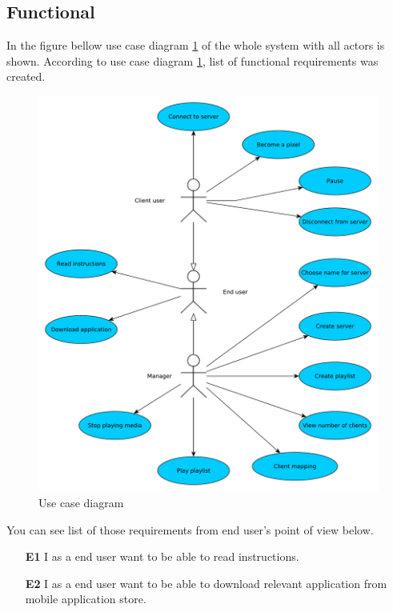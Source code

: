 \subsection{Functional}
In the figure bellow use case diagram \ref{img:usecase} of the whole system with all actors is shown.
According to use case diagram \ref{img:usecase}, list of functional requirements was created.

\begin{figure}[h!]
    \begin{center}
    \includegraphics[scale=0.45]{images/usecase.pdf}
    \caption{Use case diagram}
    \label{img:usecase}
    \end{center}
\end{figure}

You can see list of those requirements from end user's point of view below.

\begin{enumerate}
	\item[\textbf{E1}] \label{req_E1}
		I as a end user want to be able to read instructions.
	\item[\textbf{E2}] \label{req_E2}
		I as a end user want to be able to download relevant application from mobile application store.
\end{enumerate}


